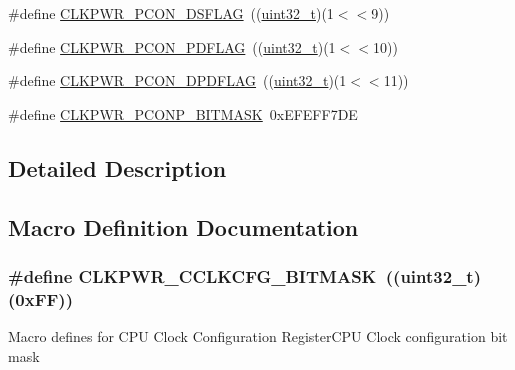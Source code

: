 \begin{DoxyCompactItemize}
\item 
\#define \hyperlink{group___c_l_k_p_w_r___private___macros_ga5039277ff3f9921e4dba4e4cf0763bf0}{C\+L\+K\+P\+W\+R\+\_\+\+P\+C\+O\+N\+\_\+\+D\+S\+F\+L\+AG}~((\hyperlink{_p_e___types_8h_a33594304e786b158f3fb30289278f5af}{uint32\+\_\+t})(1$<$$<$9))
\item 
\#define \hyperlink{group___c_l_k_p_w_r___private___macros_gadbb0d85e6c55d95d6996f552a266c563}{C\+L\+K\+P\+W\+R\+\_\+\+P\+C\+O\+N\+\_\+\+P\+D\+F\+L\+AG}~((\hyperlink{_p_e___types_8h_a33594304e786b158f3fb30289278f5af}{uint32\+\_\+t})(1$<$$<$10))
\item 
\#define \hyperlink{group___c_l_k_p_w_r___private___macros_gac6ffbb5289e04f199c9b5e4596b745e8}{C\+L\+K\+P\+W\+R\+\_\+\+P\+C\+O\+N\+\_\+\+D\+P\+D\+F\+L\+AG}~((\hyperlink{_p_e___types_8h_a33594304e786b158f3fb30289278f5af}{uint32\+\_\+t})(1$<$$<$11))
\item 
\#define \hyperlink{group___c_l_k_p_w_r___private___macros_gaf50970fcbb5758ba9699c016114ae066}{C\+L\+K\+P\+W\+R\+\_\+\+P\+C\+O\+N\+P\+\_\+\+B\+I\+T\+M\+A\+SK}~0x\+E\+F\+E\+F\+F7\+DE
\end{DoxyCompactItemize}


\subsection{Detailed Description}


\subsection{Macro Definition Documentation}
\subsubsection[{\texorpdfstring{C\+L\+K\+P\+W\+R\+\_\+\+C\+C\+L\+K\+C\+F\+G\+\_\+\+B\+I\+T\+M\+A\+SK}{CLKPWR_CCLKCFG_BITMASK}}]{\setlength{\rightskip}{0pt plus 5cm}\#define C\+L\+K\+P\+W\+R\+\_\+\+C\+C\+L\+K\+C\+F\+G\+\_\+\+B\+I\+T\+M\+A\+SK~(({\bf uint32\+\_\+t})(0x\+F\+F))}\hypertarget{group___c_l_k_p_w_r___private___macros_ga0ab96470807340781971aed85a29c68f}{}\label{group___c_l_k_p_w_r___private___macros_ga0ab96470807340781971aed85a29c68f}
Macro defines for C\+PU Clock Configuration Register\+C\+PU Clock configuration bit mask 

